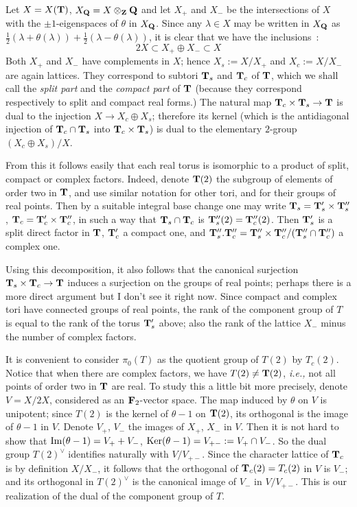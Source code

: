 \documentclass[11pt,draft]{article}
\newcommand{\ra}{\rightarrow}
\newcommand{\F}{{\bf F}}
\renewcommand{\Im}{{\rm Im}}
\newcommand{\Ker}{{\rm Ker}}
\renewcommand{\l}{\lambda}
\newcommand{\Q}{{\bf Q}}
\newcommand{\T}{{\bf T}}
\newcommand{\Z}{{\bf Z}}
\begin{document}
Let $X=X(\T)$, $X_\Q=X\otimes_\Z\Q$ and let $X_+$ and $X_-$ be the 
intersections of $X$ with the $\pm1$-eigenspaces of $\theta$ in $X_\Q$. Since 
any $\l\in X$ may be written in $X_\Q$ as 
$\frac{1}{2}(\l+\theta(\l))+\frac{1}{2}(\l-\theta(\l))$, it is clear that
we have the inclusions~:
$$
2X\subset X_+\oplus X_-\subset X
$$
Both $X_+$ and $X_-$ have complements in $X$; hence $X_s:=X/X_+$ and 
$X_c:=X/X_-$ are again lattices. They correspond to subtori $\T_s$ and $\T_c$
of $\T$, which we shall call the {\em split part} and the {\em compact part}
of $\T$ (because they correspond respectively to split and compact real forms.)
The natural map $\T_c\times\T_s\ra\T$ is dual to the injection 
$X\ra X_c\oplus X_s$; therefore its kernel (which is the antidiagonal injection
of $\T_c\cap\T_s$ into $\T_c\times\T_s$) is dual to the
elementary $2$-group $(X_c\oplus X_s)/X$.

From this it follows easily that each real torus is isomorphic to a product
of split, compact or complex factors. Indeed, denote $\T(2)$ the subgroup of 
elements of order two in $\T$, and use similar notation for other tori, and for
their groups of real points. Then by a suitable integral base change one
may write $\T_s=\T'_s\times\T''_s$, $\T_c=\T'_c\times\T''_c$, in such a way
that $\T_s\cap\T_c$ is $\T''_s(2)=\T''_c(2)$. Then $\T'_s$ is a split direct
factor in $\T$, $\T'_c$ a compact one, and 
$\T''_s.\T''_c=\T''_s\times\T''_c/(\T''_s\cap\T''_c)$ a complex one.

Using this decomposition, it also follows that the canonical surjection
$\T_s\times\T_c\ra\T$ induces a surjection on the groups of real points;
perhaps there is a more direct argument but I don't see it right now.
Since compact and complex tori have connected groups of real points, the
rank of the component group of $T$ is equal to the rank of the torus $\T'_s$
above; also the rank of the lattice $X_-$ minus the number of complex factors.

It is convenient to consider $\pi_0(T)$ as the quotient group of $T(2)$ by
$T_c(2)$. Notice that when there are complex factors, we have $T(2)\neq\T(2)$,
{\em i.e.,} not all points of order two in $\T$ are real. To study this a
little bit more precisely, denote $V=X/2X$, considered as an $\F_2$-vector
space. The map induced by $\theta$ on $V$ is unipotent; since $T(2)$ is the
kernel of $\theta-1$ on $\T(2)$, its orthogonal is the image of $\theta-1$
in $V$. Denote $V_+$, $V_-$ the images of $X_+$, $X_-$ in $V$. Then it is
not hard to show that $\Im(\theta-1)=V_++V_-$, 
$\Ker(\theta-1)=V_{+-}:=V_+\cap V_-$. So the dual group $T(2)^\vee$ identifies
naturally with $V/V_{+-}$. Since the character lattice of $\T_c$ is by
definition $X/X_-$, it follows that the orthogonal of $\T_c(2)=T_c(2)$ in
$V$ is $V_-$; and its orthogonal in $T(2)^\vee$ is the canonical image
of $V_-$ in $V/V_{+-}$. This is our realization of the dual of the component
group of $T$.
\end{document}

